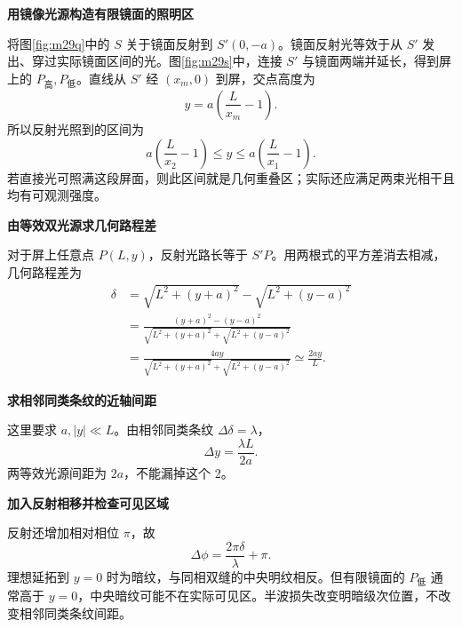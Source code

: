 \begin{solution}\textbf{用镜像光源构造有限镜面的照明区}\par\nobreak
将图\ref{fig:m29q}中的 \(S\) 关于镜面反射到 \(S'(0,-a)\)。镜面反射光等效于从 \(S'\) 发出、穿过实际镜面区间的光。图\ref{fig:m29s}中，连接 \(S'\) 与镜面两端并延长，得到屏上的 \(P_{\text{高}},P_{\text{低}}\)。直线从 \(S'\) 经 \((x_m,0)\) 到屏，交点高度为
\[
 y=a\left(\frac L{x_m}-1\right).
\]
所以反射光照到的区间为
\[
 \boxed{a\left(\frac L{x_2}-1\right)\le y
 \le a\left(\frac L{x_1}-1\right)}.
\]
若直接光可照满这段屏面，则此区间就是几何重叠区；实际还应满足两束光相干且均有可观测强度。



\par\medskip{}\noindent\textbf{由等效双光源求几何路程差}\par\nobreak
对于屏上任意点 \(P(L,y)\)，反射光路长等于 \(S'P\)。用两根式的平方差消去相减，几何路程差为
\begin{align*}
 \delta&=\sqrt{L^2+(y+a)^2}-\sqrt{L^2+(y-a)^2}\\
 &=\frac{(y+a)^2-(y-a)^2}
 {\sqrt{L^2+(y+a)^2}+\sqrt{L^2+(y-a)^2}}\\
 &=\frac{4ay}{\sqrt{L^2+(y+a)^2}+\sqrt{L^2+(y-a)^2}}
 \simeq\frac{2ay}{L}.
\end{align*}


\par\medskip{}\noindent\textbf{求相邻同类条纹的近轴间距}\par\nobreak
这里要求 \(a,|y|\ll L\)。由相邻同类条纹 \(\Delta\delta=\lambda\)，
\[
 \boxed{\Delta y=\frac{\lambda L}{2a}}.
\]
两等效光源间距为 \(2a\)，不能漏掉这个 2。



\par\medskip{}\noindent\textbf{加入反射相移并检查可见区域}\par\nobreak
反射还增加相对相位 \(\pi\)，故
\[
 \Delta\phi=\frac{2\pi\delta}{\lambda}+\pi.
\]
理想延拓到 \(y=0\) 时为暗纹，与同相双缝的中央明纹相反。但有限镜面的 \(P_{\text{低}}\) 通常高于 \(y=0\)，中央暗纹可能不在实际可见区。半波损失改变明暗级次位置，不改变相邻同类条纹间距。
\end{solution}

